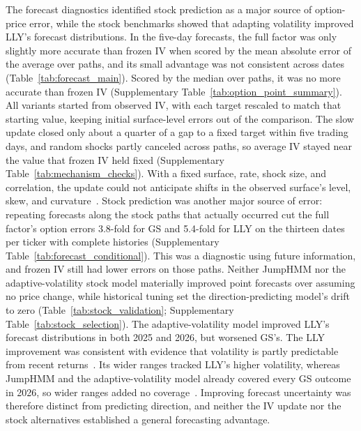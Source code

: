 The forecast diagnostics identified stock prediction as a major source of option-price error, while the stock benchmarks showed that adapting volatility improved LLY's forecast distributions. In the five-day forecasts, the full factor was only slightly more accurate than frozen IV when scored by the mean absolute error of the average over paths, and its small advantage was not consistent across dates (Table~\ref{tab:forecast_main}). Scored by the median over paths, it was no more accurate than frozen IV (Supplementary Table~\ref{tab:option_point_summary}). All variants started from observed IV, with each target rescaled to match that starting value, keeping initial surface-level errors out of the comparison. The slow update closed only about a quarter of a gap to a fixed target within five trading days, and random shocks partly canceled across paths, so average IV stayed near the value that frozen IV held fixed (Supplementary Table~\ref{tab:mechanism_checks}). With a fixed surface, rate, shock size, and correlation, the update could not anticipate shifts in the observed surface's level, skew, and curvature~\cite{cont2002}. Stock prediction was another major source of error: repeating forecasts along the stock paths that actually occurred cut the full factor's option errors 3.8-fold for GS and 5.4-fold for LLY on the thirteen dates per ticker with complete histories (Supplementary Table~\ref{tab:forecast_conditional}). This was a diagnostic using future information, and frozen IV still had lower errors on those paths. Neither JumpHMM nor the adaptive-volatility stock model materially improved point forecasts over assuming no price change, while historical tuning set the direction-predicting model's drift to zero (Table~\ref{tab:stock_validation}; Supplementary Table~\ref{tab:stock_selection}). The adaptive-volatility model improved LLY's forecast distributions in both 2025 and 2026, but worsened GS's. The LLY improvement was consistent with evidence that volatility is partly predictable from recent returns~\cite{cont2001,andersen1998}. Its wider ranges tracked LLY's higher volatility, whereas JumpHMM and the adaptive-volatility model already covered every GS outcome in 2026, so wider ranges added no coverage~\cite{gneiting2007calibration}. Improving forecast uncertainty was therefore distinct from predicting direction, and neither the IV update nor the stock alternatives established a general forecasting advantage.

